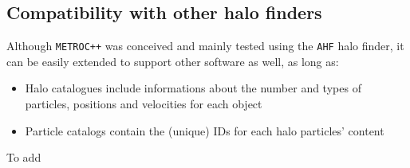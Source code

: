 \documentclass{article}
\begin{document}
\subsection{Compatibility with other halo finders}

Although \texttt{METROC++} was conceived and mainly tested using the \texttt{AHF} halo finder, it can be easily extended to 
support other software as well, as long as:

\begin{itemize}
\item Halo catalogues include informations about the number and types of particles, positions and velocities for each object
\item Particle catalogs contain the (unique) IDs for each halo particles' content
\end{itemize}

To add 
\end{document}
